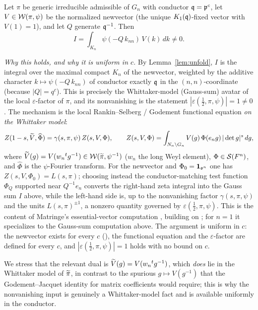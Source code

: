 \begin{qtwotheorem}\label{thm:newvector}
Let $\pi$ be generic irreducible admissible of $G_n$ with conductor $\mathfrak{q}=\mathfrak{p}^{c}$, let
$V\in\mathcal{W}(\pi,\psi)$ be the normalized newvector \textup{(}the unique $K_1(\mathfrak{q})$-fixed
vector with $V(1)=1$\textup{)}, and let $Q$ generate $\mathfrak{q}^{-1}$. Then
\[
I=\int_{K_n}\psi(-Q\,k_{nn})\,V(k)\,dk\neq0 .
\]
\end{qtwotheorem}

\noindent\emph{Why this holds, and why it is uniform in $c$.} By Lemma~\ref{lem:unfold},
$I$ is the integral over the maximal compact $K_n$ of the newvector, weighted by the additive
character $k\mapsto\psi(-Q\,k_{nn})$ of conductor exactly $\mathfrak{q}$ in the $(n,n)$-coordinate
\textup{(}because $|Q|=q^{c}$\textup{)}. This is precisely the Whittaker-model
\textup{(}Gauss-sum\textup{)} avatar of the local $\varepsilon$-factor of $\pi$, and its
nonvanishing is the statement $|\varepsilon(\tfrac12,\pi,\psi)|=1\neq0$. The mechanism is the
local Rankin--Selberg / Godement functional equation \emph{on the Whittaker model}:
\[
Z(1-s,\widetilde{V},\widehat\Phi)=\gamma(s,\pi,\psi)\,Z(s,V,\Phi),\qquad
Z(s,V,\Phi)=\int_{N_n\backslash G_n}V(g)\,\Phi(e_n g)\,|\det g|^{s}\,dg,
\]
where $\widetilde{V}(g)=V(w_n{}^{t}g^{-1})\in\mathcal{W}(\widetilde{\pi},\psi^{-1})$ \textup{(}$w_n$ the
long Weyl element\textup{)}, $\Phi\in\mathcal S(F^{n})$, and $\widehat\Phi$ is the
$\psi$-Fourier transform. For the newvector and $\Phi_0=\mathbf 1_{\mathfrak{o}^{n}}$ one has
$Z(s,V,\Phi_0)=L(s,\pi)$; choosing instead the conductor-matching test function
$\Phi_Q$ supported near $Q^{-1}e_n$ converts the right-hand zeta integral into the Gauss sum $I$
above, while the left-hand side is, up to the nonvanishing factor $\gamma(s,\pi,\psi)$ and the
units $L(s,\pi)^{\pm1}$, a nonzero quantity governed by $\varepsilon(\tfrac12,\pi,\psi)$. This is
the content of Matringe's essential-vector computation \cite[Thm.~1.1, \S3]{Matringe}, building on
\cite[\S\S4--5]{JPSS81}; for $n=1$ it specializes to the Gauss-sum computation above. The argument
is uniform in $c$: the newvector exists for every $c$ \textup{(}\cite{JPSS81}\textup{)}, the
functional equation and the $\varepsilon$-factor are defined for every $c$, and
$|\varepsilon(\tfrac12,\pi,\psi)|=1$ holds with no bound on $c$.

\medskip
\noindent We stress that the relevant dual is $\widetilde{V}(g)=V(w_n{}^{t}g^{-1})$, which
\emph{does} lie in the Whittaker model of $\widetilde{\pi}$, in contrast to the spurious
$g\mapsto V(g^{-1})$ that the Godement--Jacquet identity for matrix coefficients would require;
this is why the nonvanishing input is genuinely a Whittaker-model fact and is available uniformly
in the conductor.

